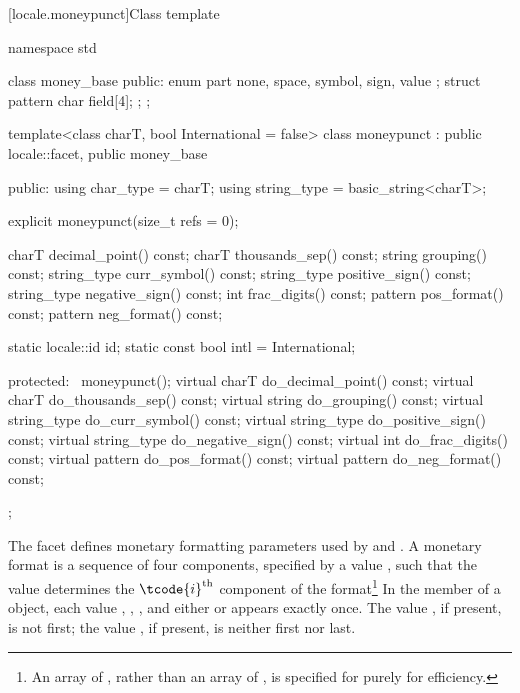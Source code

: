 [locale.moneypunct]{Class template }

%
\begin{codeblock}
namespace std {
  class money_base {
  public:
    enum part { none, space, symbol, sign, value };
    struct pattern { char field[4]; };
  };

  template<class charT, bool International = false>
    class moneypunct : public locale::facet, public money_base {
    public:
      using char_type   = charT;
      using string_type = basic_string<charT>;

      explicit moneypunct(size_t refs = 0);

      charT        decimal_point() const;
      charT        thousands_sep() const;
      string       grouping()      const;
      string_type  curr_symbol()   const;
      string_type  positive_sign() const;
      string_type  negative_sign() const;
      int          frac_digits()   const;
      pattern      pos_format()    const;
      pattern      neg_format()    const;

      static locale::id id;
      static const bool intl = International;

    protected:
      ~moneypunct();
      virtual charT        do_decimal_point() const;
      virtual charT        do_thousands_sep() const;
      virtual string       do_grouping()      const;
      virtual string_type  do_curr_symbol()   const;
      virtual string_type  do_positive_sign() const;
      virtual string_type  do_negative_sign() const;
      virtual int          do_frac_digits()   const;
      virtual pattern      do_pos_format()    const;
      virtual pattern      do_neg_format()    const;
    };
}
\end{codeblock}

\pnum
The
facet defines monetary formatting parameters used by
and
.
A monetary format is a sequence of four components,
specified by a
value
,
such that the
value
determines the
$\tcode{i}^\text{th}$
component of the format\footnote{An array of
,
rather than an array of
,
is specified for
purely for efficiency.}
In the
member of a
object, each value
,
,
,
and either
or
appears exactly once.
The value
,
if present, is not first;
the value
,
if present, is neither first nor last.

